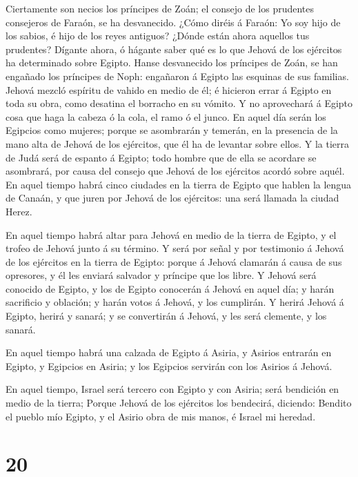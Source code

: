  Ciertamente son necios los príncipes de Zoán; el consejo
de los prudentes consejeros de Faraón, se ha desvanecido. ¿Cómo diréis á
Faraón: Yo soy hijo de los sabios, é hijo de los reyes antiguos?
 ¿Dónde están ahora aquellos tus prudentes? Dígante ahora,
ó hágante saber qué es lo que Jehová de los ejércitos ha determinado
sobre Egipto.  Hanse desvanecido los príncipes de Zoán, se
han engañado los príncipes de Noph: engañaron á Egipto las esquinas de
sus familias.  Jehová mezcló espíritu de vahido en medio de
él; é hicieron errar á Egipto en toda su obra, como desatina el borracho
en su vómito.  Y no aprovechará á Egipto cosa que haga la
cabeza ó la cola, el ramo ó el junco.  En aquel día serán
los Egipcios como mujeres; porque se asombrarán y temerán, en la
presencia de la mano alta de Jehová de los ejércitos, que él ha de
levantar sobre ellos.  Y la tierra de Judá será de espanto
á Egipto; todo hombre que de ella se acordare se asombrará, por causa
del consejo que Jehová de los ejércitos acordó sobre aquél.
 En aquel tiempo habrá cinco ciudades en la tierra de
Egipto que hablen la lengua de Canaán, y que juren por Jehová de los
ejércitos: una será llamada la ciudad Herez.

 En aquel tiempo habrá altar para Jehová en medio de la
tierra de Egipto, y el trofeo de Jehová junto á su término.
 Y será por señal y por testimonio á Jehová de los
ejércitos en la tierra de Egipto: porque á Jehová clamarán á causa de
sus opresores, y él les enviará salvador y príncipe que los libre.
 Y Jehová será conocido de Egipto, y los de Egipto
conocerán á Jehová en aquel día; y harán sacrificio y oblación; y harán
votos á Jehová, y los cumplirán.  Y herirá Jehová á Egipto,
herirá y sanará; y se convertirán á Jehová, y les será clemente, y los
sanará.

 En aquel tiempo habrá una calzada de Egipto á Asiria, y
Asirios entrarán en Egipto, y Egipcios en Asiria; y los Egipcios
servirán con los Asirios á Jehová.

 En aquel tiempo, Israel será tercero con Egipto y con
Asiria; será bendición en medio de la tierra;  Porque
Jehová de los ejércitos los bendecirá, diciendo: Bendito el pueblo mío
Egipto, y el Asirio obra de mis manos, é Israel mi heredad.

\hypertarget{section-19}{%
\section{20}\label{section-19}}

